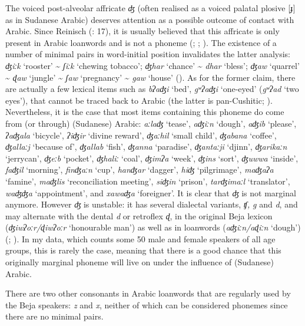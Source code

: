 \documentclass[output=paper]{langsci/langscibook}
\begin{document}
The voiced post-alveolar affricate \textit{ʤ} (often realised as a voiced palatal plosive [ɟ] as in Sudanese Arabic) deserves attention as a possible outcome of contact with Arabic. Since Reinisch (\citeyear{Reinisch1893}: 17), it is usually believed that this affricate is only present in Arabic loanwords and is not a phoneme (\citealt{Roper1928}; \citealt{Hudson1976}; \citealt{Morin1995}). The existence of a number of minimal pairs in word-initial position invalidates the latter analysis: \textit{ʤiːk} ‘rooster’ {\textasciitilde} \textit{ʃiːk} ‘chewing tobacco’; \textit{ʤhar} ‘chance’ {\textasciitilde} \textit{dhar} ‘bless’; \textit{ʤaw} ‘quarrel’ {\textasciitilde} \textit{ɖaw} ‘jungle’ {\textasciitilde} \textit{ʃaw} ‘pregnancy’ {\textasciitilde} \textit{gaw} ‘house’ (\citealt{Vanhove2017}). As for the former claim, there are actually a few lexical items such as \textit{bʔaʤi} ‘bed’, \textit{gʷʔaʤi} ‘one-eyed’ (\textit{gʷʔad} ‘two eyes’), that cannot be traced back to Arabic (the latter is pan-Cushitic; \citealt{Blažek2000}). Nevertheless, it is the case that most items containing this phoneme do come from (or through) (Sudanese) Arabic: \textit{aːlaʤ} ‘tease’, \textit{aʤiːn} ‘dough’, \textit{aʤib} ‘please’, \textit{ʔaʤala} ‘bicycle’, \textit{ʔiʤir} ‘divine reward’, \textit{ʤaːhil} ‘small child’, \textit{ʤabana} ‘coffee’, \textit{ʤallaːj} ‘because of’, \textit{ʤallab} ‘fish’, \textit{ʤanna} ‘paradise’, \textit{ʤantaːji} ‘djinn’, \textit{ʤarikaːn} ‘jerrycan’, \textit{ʤeːb} ‘pocket’, \textit{ʤhaliː} ‘coal’, \textit{ʤimʔa} ‘week’, \textit{ʤins} ‘sort’, \textit{ʤuwwa} ‘inside’, \textit{faʤil} ‘morning’, \textit{finʤaːn} ‘cup’, \textit{hanʤar} ‘dagger’, \textit{hiʤ} ‘pilgrimage’, \textit{maʤaʔa} ‘famine’, \textit{maʤlis} ‘reconciliation meeting’, \textit{siʤin} ‘prison’, \textit{tarʤimaːl} ‘translator’, \textit{waʤʤa} ‘appointment’, and \textit{xawaʤa} ‘foreigner’. It is clear that \textit{ʤ} is not marginal anymore. However \textit{ʤ} is unstable: it has several dialectal variants, \textit{ʧ,} \textit{g} and \textit{d}, and may alternate with the dental \textit{d} or retroflex \textit{ɖ}, in the original Beja lexicon (\textit{ʤiwʔoːr/ɖiwʔoːr} ‘honourable man’) as well as in loanwords (\textit{aʤiːn/aɖiːn} ‘dough’) (\citealt{VanhoveHamidAhmed2011}; \citealt{Vanhove2017}). In my data, which counts some 50 male and female speakers of all age groups, this is rarely the case, meaning that there is a good chance that this originally marginal phoneme will live on under the influence of (Sudanese) Arabic.

There are two other consonants in Arabic loanwords that are regularly used by the Beja speakers: \textit{z} and \textit{x}, neither of which can be considered phonemes since there are no minimal pairs.
\end{document}
